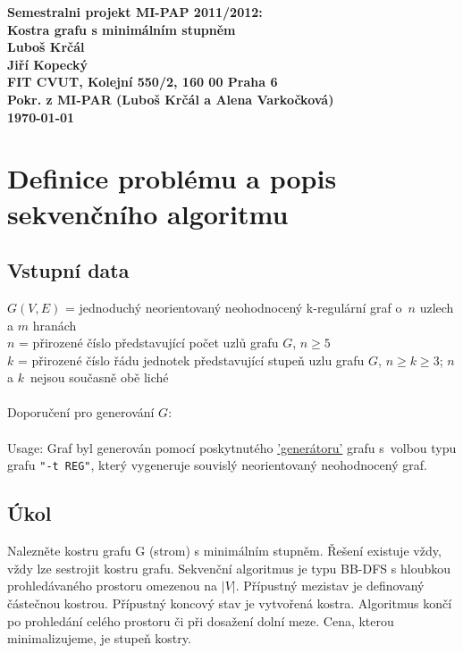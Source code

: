 \documentclass[]{article}
\begin{document}
\begin{center}
\bf Semestralni projekt MI-PAP 2011/2012:\\[5mm]
    Kostra grafu s minimálním stupněm\\[5mm] 
       Luboš Krčál\\
       Jiří Kopecký\\
       [2mm]
FIT CVUT, Kolejní 550/2, 160 00 Praha 6\\[2mm]
Pokr. z MI-PAR (Luboš Krčál a Alena Varkočková)\\[10mm]
\today
\end{center}

\section{Definice problému a popis sekvenčního algoritmu}

\subsection{Vstupní data}
$G(V,E)$ = jednoduchý neorientovaný neohodnocený k-regulární graf o~$n$ uzlech a $m$ hranách\\
$n$ = přirozené číslo představující počet uzlů grafu $G$, $n \geq 5$\\
$k$ = přirozené číslo řádu jednotek představující stupeň uzlu grafu $G$, $n \geq k \geq 3$; $n$ a $k$~nejsou současně obě liché\\
\\
Doporučení pro generování $G$:\\
\\
Usage: Graf byl generován pomocí poskytnutého \href{''https://edux.fit.cvut.cz/courses/MI-PAR/labs/zadani_semestralnich_praci/generator_grafu'}{'generátoru'} grafu s~volbou typu grafu \texttt{"-t REG"}, který vygeneruje souvislý neorientovaný neohodnocený graf.

\subsection{Úkol}
Nalezněte kostru grafu G (strom) s minimálním stupněm. Řešení existuje vždy, vždy lze sestrojit kostru grafu. Sekvenční algoritmus je typu BB-DFS s hloubkou prohledávaného prostoru omezenou na $|V|$. Přípustný mezistav je definovaný částečnou kostrou. Přípustný koncový stav je vytvořená kostra. Algoritmus končí po prohledání celého prostoru či při dosažení dolní meze. Cena, kterou minimalizujeme, je stupeň kostry.
\end{document}
